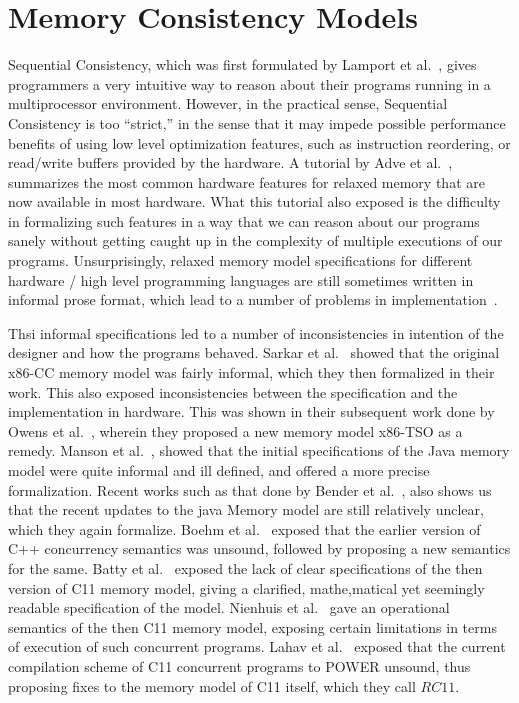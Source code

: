 \section{Memory Consistency Models}

Sequential Consistency, which was first formulated by Lamport et al.~\cite{Lamport79}, gives programmers a very intuitive way to reason about their programs running in a multiprocessor environment.
However, in the practical sense, Sequential Consistency is too ``strict,'' in the sense that it may impede possible performance benefits of using low level optimization features, such as instruction reordering, or read/write buffers provided by the hardware.
A tutorial by Adve et al.~\cite{AdveG}, summarizes the most common hardware features for relaxed memory that are now available in most hardware. 
What this tutorial also exposed is the difficulty in formalizing such features in a way that we can reason about our programs sanely without getting caught up in the complexity of multiple executions of our programs. 
Unsurprisingly, relaxed memory model specifications for different hardware / high level programming languages are still sometimes written in informal prose format, which lead to a number of problems in implementation~\cite{Sewell}. 

Thsi  informal specifications led to a number of inconsistencies in intention of the designer and how the programs behaved.
Sarkar et al.~\cite{SarkarS} showed that the original x86-CC memory model was fairly informal, which they then formalized in their work. This also exposed inconsistencies between the specification and the implementation in hardware. This was shown in their subsequent work done by Owens et al.~\cite{OwensS}, wherein they proposed a new memory model x86-TSO as a remedy. 
Manson et al.~\cite{JeremyM}, showed that the initial specifications of the Java memory model were quite informal and ill defined, and offered a more precise formalization. Recent works such as that done by Bender et al.~\cite{BenderJ}, also shows us that the recent updates to the java Memory model are still relatively unclear, which they again formalize. 
Boehm et al.~\cite{Boehm} exposed that the earlier version of C++ concurrency semantics was unsound, followed by proposing a new semantics for the same.
Batty et al.~\cite{BattyM} exposed the lack of clear specifications of the then version of C11 memory model, giving a clarified, mathe,matical yet seemingly readable specification of the model.
Nienhuis et al.~\cite{Nienhuis} gave an operational semantics of the then C11 memory model, exposing certain limitations in terms of execution of such concurrent programs.
Lahav et al.~\cite{Lahav} exposed that the current compilation scheme of C11 concurrent programs to POWER unsound, thus proposing fixes to the memory model of C11 itself, which they call $RC11$.

